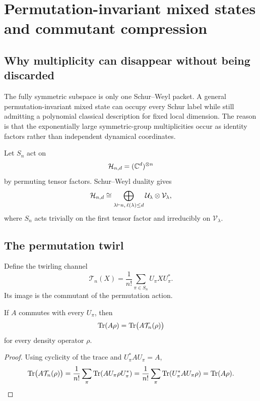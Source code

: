\chapter{Permutation-invariant mixed states and commutant compression}
\label{ch:commutant-collapse}

\section{Why multiplicity can disappear without being discarded}
The fully symmetric subspace is only one Schur--Weyl packet. A general permutation-invariant mixed state can occupy every Schur label while still admitting a polynomial classical description for fixed local dimension. The reason is that the exponentially large symmetric-group multiplicities occur as identity factors rather than independent dynamical coordinates.

Let $S_n$ act on
\[
\mathcal H_{n,d}=(\mathbb C^d)^{\otimes n}
\]
by permuting tensor factors. Schur--Weyl duality gives
\begin{equation}
\mathcal H_{n,d}
\cong
\bigoplus_{\lambda\vdash n,\,\ell(\lambda)\le d}
\mathcal U_\lambda\otimes\mathcal V_\lambda,
\label{eq:schur-decomp-commutant}
\end{equation}
where $S_n$ acts trivially on the first tensor factor and irreducibly on $\mathcal V_\lambda$.

\section{The permutation twirl}
Define the twirling channel
\begin{equation}
\mathcal T_n(X)
=
\frac1{n!}
\sum_{\pi\in S_n}
U_\pi XU_\pi^*.
\label{eq:permutation-twirl}
\end{equation}
Its image is the commutant of the permutation action.

\begin{lemma}
\label{lem:twirl-observable}
If $A$ commutes with every $U_\pi$, then
\[
\operatorname{Tr}(A\rho)
=
\operatorname{Tr}\bigl(A\mathcal T_n(\rho)\bigr)
\]
for every density operator $\rho$.
\end{lemma}

\begin{proof}
Using cyclicity of the trace and $U_\pi^*AU_\pi=A$,
\[
\operatorname{Tr}\bigl(A\mathcal T_n(\rho)\bigr)
=
\frac1{n!}\sum_\pi
\operatorname{Tr}(AU_\pi\rho U_\pi^*)
=
\frac1{n!}\sum_\pi
\operatorname{Tr}(U_\pi^*AU_\pi\rho)
=
\operatorname{Tr}(A\rho).
\]
\end{proof}

